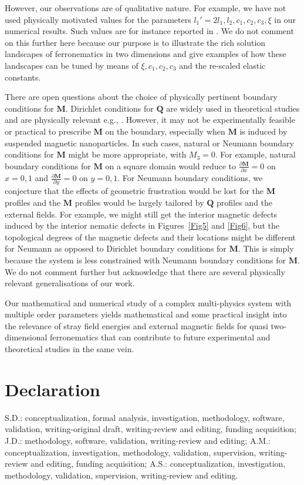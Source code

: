 \documentclass{article}
\def\Qvec{\mathbf{Q}}
\def \Mvec{\mathbf{M}}
\begin{document}
However, our observations are of qualitative nature.
For example, we have not used physically motivated values for the parameters $l_1'=2l_1, l_2, c_1, c_2, c_3, \xi$ in our numerical results.  
Such values are for instance reported in 
\cite{luo2012, newtonmottram, Zumar2009}. 
We do not comment on this further here because our purpose is to illustrate the rich solution landscapes of ferronematics in two dimensions and give examples of how these landscapes can be tuned by means of $\xi, c_1, c_2, c_3$ and the re-scaled elastic constants. 


There are open questions about the choice of physically pertinent boundary conditions for $\Mvec$. Dirichlet conditions for $\Qvec$ are widely used in theoretical studies and are physically relevant e.g., \cite{luo2012, han2021tailored, tsakonas2007, wangprl}. However, it may not be experimentally feasible or practical to prescribe $\Mvec$ on the boundary, especially when $\Mvec$ is induced by suspended magnetic nanoparticles. In such cases, natural or Neumann boundary conditions for $\Mvec$ might be more appropriate, with $M_3=0$. For example, natural boundary conditions for $\Mvec$ on a square domain would reduce to
$
\frac{\partial \Mvec}{\partial x} = 0$ on $x=0,1
$
and
$
\frac{\partial \Mvec}{\partial y} =0$ on $y=0,1.
$
For Neumann boundary conditions, we conjecture that the effects of geometric frustration would be lost for the $\Mvec$ profiles and the $\Mvec$ profiles would be largely tailored by $\Qvec$ profiles and the external fields. For example, we might still get the interior magnetic defects induced by the interior nematic defects in Figures~\ref{Fig5} and \ref{Fig6}, but the topological degrees of the magnetic defects and their locations might be different for Neumann as opposed to Dirichlet boundary conditions for $\Mvec$. This is simply because the system is less constrained with Neumann boundary conditions for $\Mvec$. We do not comment further but acknowledge that there are several physically relevant generalisations of our work. 

Our mathematical and numerical study of a complex multi-physics system with multiple order parameters yields mathematical and some practical insight into the relevance of stray field energies and external magnetic fields for quasi two-dimensional ferronematics that can contribute to future experimental and theoretical studies in the same vein.

\section{Declaration} \sloppy S.D.: conceptualization, formal analysis, investigation, methodology, software, validation, writing-original draft, writing-review and editing, funding acquisition; J.D.: methodology, software, validation, writing-review and editing; A.M.: conceptualization, investigation, methodology, validation, supervision, writing-review and editing, funding acquisition; A.S.: conceptualization, investigation, methodology, validation, supervision, writing-review and editing.
\end{document}
